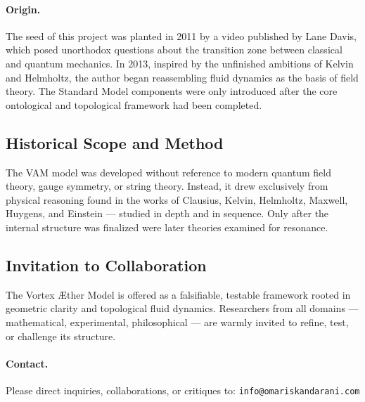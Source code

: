 \documentclass[preprint]{revtex4-2}
\begin{document}
            \paragraph{Origin.} The seed of this project was planted in 2011 by a video published by Lane Davis, which posed unorthodox questions about the transition zone between classical and quantum mechanics. In 2013, inspired by the unfinished ambitions of Kelvin and Helmholtz, the author began reassembling fluid dynamics as the basis of field theory. The Standard Model components were only introduced after the core ontological and topological framework had been completed.
        
            \subsection*{Historical Scope and Method}
            The VAM model was developed without reference to modern quantum field theory, gauge symmetry, or string theory. Instead, it drew exclusively from physical reasoning found in the works of Clausius, Kelvin, Helmholtz, Maxwell, Huygens, and Einstein — studied in depth and in sequence. Only after the internal structure was finalized were later theories examined for resonance.
        
            \subsection*{Invitation to Collaboration}
            The Vortex \AE{}ther Model is offered as a falsifiable, testable framework rooted in geometric clarity and topological fluid dynamics. Researchers from all domains — mathematical, experimental, philosophical — are warmly invited to refine, test, or challenge its structure.
        
            \paragraph{Contact.} Please direct inquiries, collaborations, or critiques to: \texttt{info@omariskandarani.com}
    
    
    
\end{document}
